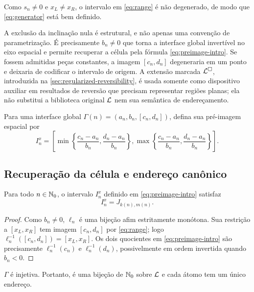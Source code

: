 Como $s_n\neq0$ e $x_L\neq x_R$, o intervalo em \eqref{eq:range} é não degenerado, de modo que \eqref{eq:generator} está bem definido.

A exclusão da inclinação nula é estrutural, e não apenas uma convenção de
parametrização. É precisamente $b_n\neq0$ que torna a interface global
invertível no eixo espacial e permite recuperar a célula pela fórmula
\eqref{eq:preimage-intro}. Se fossem admitidas peças constantes, a imagem
$[c_n,d_n]$ degeneraria em um ponto e deixaria de codificar o intervalo de
origem. A extensão marcada $\mathcal{L}^\square$, introduzida na
\cref{sec:regularized-reversibility}, é usada somente como dispositivo auxiliar
em resultados de reversão que precisam representar regiões planas; ela não
substitui a biblioteca original $\mathcal{L}$ nem sua semântica de endereçamento.

Para uma interface global $\Gamma(n)=(a_n,b_n,[c_n,d_n])$, defina sua
pré-imagem espacial por
\begin{equation}
 I_n^x=\left[
 \min\!\left\{\frac{c_n-a_n}{b_n},\frac{d_n-a_n}{b_n}\right\},
 \max\!\left\{\frac{c_n-a_n}{b_n},\frac{d_n-a_n}{b_n}\right\}
 \right].
 \label{eq:preimage-intro}
\end{equation}

\subsection{Recuperação da célula e endereço canônico}

\begin{lemma}\label{lem:cell-recovery}
Para todo $n\in\mathbb{N}_0$, o intervalo $I_n^x$ definido em \eqref{eq:preimage-intro} satisfaz
\[
 I_n^x=J_{k(n),m(n)}.
\]
\end{lemma}

\begin{proof}
Como $b_n\neq0$, $\ell_n$ é uma bijeção afim estritamente monótona. Sua restrição a $[x_L,x_R]$ tem imagem $[c_n,d_n]$ por \eqref{eq:range}; logo $\ell_n^{-1}([c_n,d_n])=[x_L,x_R]$. Os dois quocientes em \eqref{eq:preimage-intro} são precisamente $\ell_n^{-1}(c_n)$ e $\ell_n^{-1}(d_n)$, possivelmente em ordem invertida quando $b_n<0$.
\end{proof}

\begin{theorem}\label{thm:injective}
$\Gamma$ é injetiva. Portanto, é uma bijeção de $\mathbb{N}_0$ sobre $\mathcal{L}$ e cada átomo tem um único endereço.
\end{theorem}

